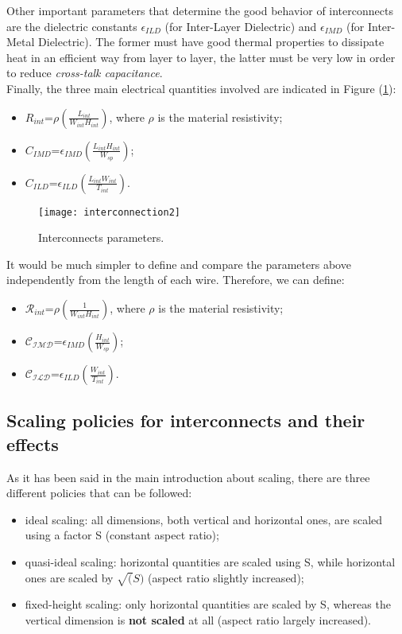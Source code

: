 \documentclass[a4paper, 12pt, twoside, openright]{report}
\begin{document}
Other important parameters that determine the good behavior of interconnects are the dielectric constants $\epsilon_{ILD}$ (for Inter-Layer Dielectric) and $\epsilon_{IMD}$ (for Inter-Metal Dielectric). The former must have good thermal properties to dissipate heat in an efficient way from layer to layer, the latter must be very low in order to reduce \textit{cross-talk capacitance}.\\ Finally, the three main electrical quantities involved are indicated in Figure (\ref{figint2}):

\begin{itemize}
\item $R_{int}$=$\rho(\frac{L_{int}}{W_{int}H_{int}})$, where $\rho$ is the material resistivity;
\item $C_{IMD}$=$\epsilon_{IMD}(\frac{L_{int}H_{int}}{W_{sp}})$;
\item $C_{ILD}$=$\epsilon_{ILD}(\frac{L_{int}W_{int}}{T_{int}})$.
\end{itemize}

	\begin{figure}[H]
	\centering
	\texttt{[image: interconnection2]}
	\caption{Interconnects parameters.}
	\label{figint2}
	\end{figure}

It would be much simpler to define and compare the parameters above independently from the length of each wire. Therefore, we can define:
\begin{itemize}
\item $\mathcal{R}_{int}$=$\rho(\frac{1}{W_{int}H_{int}})$, where $\rho$ is the material resistivity;
\item $\mathcal{C_{IMD}}$=$\epsilon_{IMD}(\frac{H_{int}}{W_{sp}})$;
\item $\mathcal{C_{ILD}}$=$\epsilon_{ILD}(\frac{W_{int}}{T_{int}})$.
\end{itemize}

\subsection{Scaling policies for interconnects and their effects}
As it has been said in the main introduction about scaling, there are three different policies that can be followed:
\begin{itemize}
\item ideal scaling: all dimensions, both vertical and horizontal ones, are scaled using a factor S (constant aspect ratio);
\item quasi-ideal scaling: horizontal quantities are scaled using S, while horizontal ones are scaled by $\sqrt(S)$ (aspect ratio slightly increased); 
\item fixed-height scaling: only horizontal quantities are scaled by S, whereas the vertical dimension is \textbf{not scaled} at all (aspect ratio largely increased). 
\end{itemize}
\end{document}
